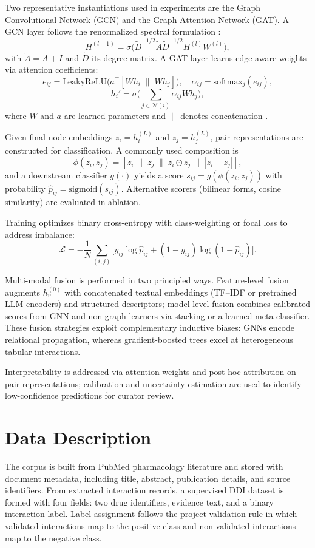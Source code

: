 \documentclass[conference]{Template/IEEEtran}
\begin{document}
Two representative instantiations used in experiments are the Graph Convolutional Network (GCN) and the Graph Attention Network (GAT). A GCN layer follows the renormalized spectral formulation \cite{kipf2017semi}:
$$
H^{(l+1)} = \sigma\big(\widetilde{D}^{-1/2}\widetilde{A}\widetilde{D}^{-1/2} H^{(l)} W^{(l)}\big),
$$
with $\widetilde{A}=A+I$ and $\widetilde{D}$ its degree matrix. A GAT layer learns edge-aware weights via attention coefficients:
$$
e_{ij}=\mathrm{LeakyReLU}\big(a^\top [W h_i \;\|\; W h_j]\big),\quad
\alpha_{ij}=\mathrm{softmax}_j(e_{ij}),
$$
$$
h_i' = \sigma\Big(\sum_{j\in\mathcal{N}(i)} \alpha_{ij} W h_j\Big),
$$
where $W$ and $a$ are learned parameters and $\|$ denotes concatenation \cite{velickovic2018graph}.

Given final node embeddings $z_i=h_i^{(L)}$ and $z_j=h_j^{(L)}$, pair representations are constructed for classification. A commonly used composition is
$$
\phi(z_i,z_j) = [z_i \;\|\; z_j \;\|\; z_i \odot z_j \;\|\; |z_i - z_j|],
$$
and a downstream classifier $g(\cdot)$ yields a score $s_{ij}=g(\phi(z_i,z_j))$ with probability $\hat{p}_{ij}=\mathrm{sigmoid}(s_{ij})$. Alternative scorers (bilinear forms, cosine similarity) are evaluated in ablation.

Training optimizes binary cross-entropy with class-weighting or focal loss to address imbalance:
$$
\mathcal{L} = -\frac{1}{N}\sum_{(i,j)}\big[y_{ij}\log\hat{p}_{ij} + (1-y_{ij})\log(1-\hat{p}_{ij})\big].
$$

Multi-modal fusion is performed in two principled ways. Feature-level fusion augments $h_v^{(0)}$ with concatenated textual embeddings (TF--IDF or pretrained LLM encoders) and structured descriptors; model-level fusion combines calibrated scores from GNN and non-graph learners via stacking or a learned meta-classifier. These fusion strategies exploit complementary inductive biases: GNNs encode relational propagation, whereas gradient-boosted trees excel at heterogeneous tabular interactions.

Interpretability is addressed via attention weights and post-hoc attribution on pair representations; calibration and uncertainty estimation are used to identify low-confidence predictions for curator review.

\section{Data Description}
The corpus is built from PubMed pharmacology literature and stored with document metadata, including title, abstract, publication details, and source identifiers. From extracted interaction records, a supervised DDI dataset is formed with four fields: two drug identifiers, evidence text, and a binary interaction label. Label assignment follows the project validation rule in which validated interactions map to the positive class and non-validated interactions map to the negative class.
\end{document}
